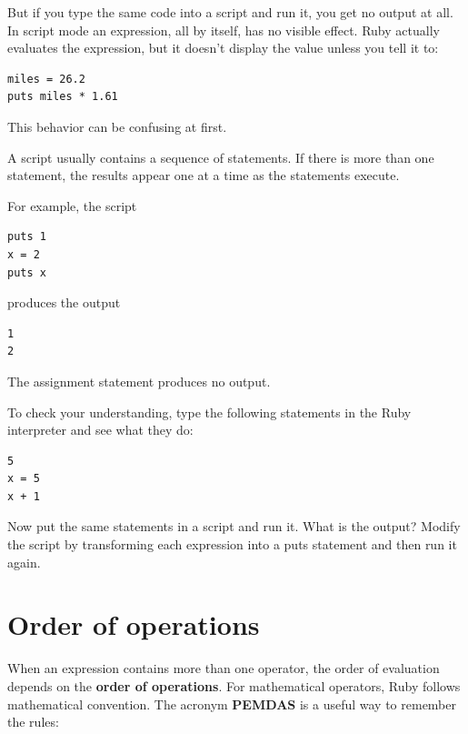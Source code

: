 \documentclass[10pt]{book}
\begin{document}
But if you type the same code into a script and run it, you get no
output at all.  In script mode an expression, all by itself, has no
visible effect.  Ruby actually evaluates the expression, but it doesn't
display the value unless you tell it to:

\begin{verbatim}
miles = 26.2
puts miles * 1.61
\end{verbatim}

This behavior can be confusing at first.

A script usually contains a sequence of statements.  If there
is more than one statement, the results appear one at a time
as the statements execute.

For example, the script

\begin{verbatim}
puts 1
x = 2
puts x
\end{verbatim}
%
produces the output

\begin{verbatim}
1
2
\end{verbatim}
%
The assignment statement produces no output.

To check your understanding, type the following statements in the
Ruby interpreter and see what they do:

\begin{verbatim}
5
x = 5
x + 1
\end{verbatim}

Now put the same statements in a script and run it.  What
is the output?  Modify the script by transforming each
expression into a puts statement and then run it again.



\section{Order of operations}

When an expression contains more than one operator, the order of
evaluation depends on the {\bf order of operations}.  For
mathematical operators, Ruby follows mathematical convention.
The acronym {\bf PEMDAS} is a useful way to
remember the rules:
\end{document}
